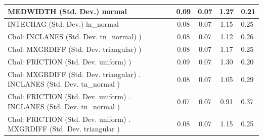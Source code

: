 \begin{table}
\begin{center}
\begin{tabular}{|l|l|c|c|c|l|}
			\hline
			MEDWIDTH (Std. Dev.) normal &  & 0.09 & 0.07 & 1.27 & 0.21 \\
			\hline
			INTECHAG (Std. Dev.) ln_normal &  & 0.08 & 0.07 & 1.15 & 0.25 \\
			\hline
			 Chol: INCLANES (Std. Dev. tn_normal) ) &  & 0.08 & 0.07 & 1.12 & 0.26 \\
			\hline
			 Chol: MXGRDIFF (Std. Dev. triangular) ) &  & 0.08 & 0.07 & 1.17 & 0.25 \\
			\hline
			 Chol: FRICTION (Std. Dev. uniform) ) &  & 0.09 & 0.07 & 1.30 & 0.20 \\
			\hline
			 Chol: MXGRDIFF (Std. Dev. triangular) . INCLANES (Std. Dev.   tn_normal ) &  & 0.08 & 0.07 & 1.05 & 0.29 \\
			\hline
			 Chol: FRICTION (Std. Dev. uniform) . INCLANES (Std. Dev.   tn_normal ) &  & 0.07 & 0.07 & 0.91 & 0.37 \\
			\hline
			 Chol: FRICTION (Std. Dev. uniform) . MXGRDIFF (Std. Dev.   triangular ) &  & 0.08 & 0.07 & 1.15 & 0.25 \\
			\hline
		\end{tabular}
	\end{center}
\end{table}